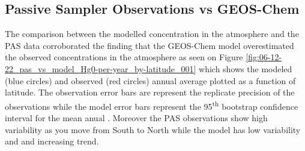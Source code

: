 \begin{table}[H]
\label{tab:modelvsobs metrics}

\centering
{}

\end{table}
\begin{flushleft}
 
\end{flushleft}


\subsection{Passive Sampler Observations vs GEOS-Chem}
\begin{flushleft}
 The comparison between the modelled concentration in the atmosphere and the PAS data corroborated the finding that the GEOS-Chem model overestimated the observed concentrations in the atmosphere as seen on Figure \ref{fig:06-12-22_pas_vs_model_Hg0-per-year_by-latitude_001} which shows the modeled (blue circles) and observed (red circles) annual average \hg plotted as a function of latitude. The observation error bars are represent the replicate precision of the observations while the model error bars represent the 95\textsuperscript{th} bootstrap confidence interval for the mean anual \hg. Moreover the PAS observations show high variability as you move from South to North while the model has low variability and and increasing trend.  
\end{flushleft}

